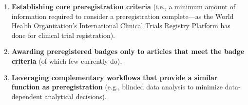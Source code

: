 \documentclass[authordate, meta]{jote-new-article}
\begin{document}
\begin{fullwidth}
  \begin{enumerate}[leftmargin=!,itemindent=0pt]


    \item \textbf{Establishing core preregistration criteria }(i.e., a minimum amount of information required to consider a preregistration complete—as the World Health Organization’s International Clinical Trials Registry Platform has done for clinical trial registration).


    \item \textbf{Awarding preregistered badges only to articles that meet the badge criteria }(of which few currently do).


    \item \textbf{Leveraging complementary workflows that provide a similar function as preregistration }(e.g., blinded data analysis to minimize data-dependent analytical decisions).


  \end{enumerate}
\end{fullwidth}
\end{document}
